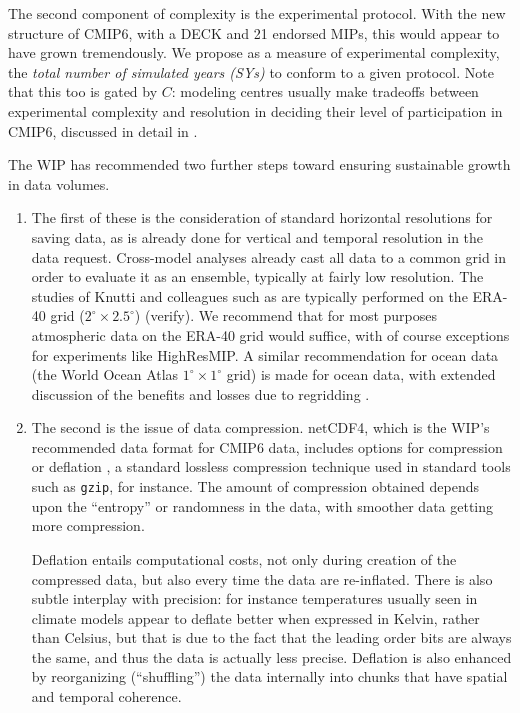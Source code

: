 \documentclass[gmd,manuscript]{copernicus}
\newcommand{\bibref}[1] { \cite{ref:#1}}
\newcommand{\pipref}[1] {\citep{ref:#1}}
\begin{document}
\begin{description}
  The second component of complexity is the experimental protocol.
  With the new structure of CMIP6, with a DECK and 21 endorsed MIPs,
  this would appear to have grown tremendously. We propose as a
  measure of experimental complexity, the \emph{total number of
    simulated years (SYs)} to conform to a given protocol. Note that
  this too is gated by $C$: modeling centres usually make tradeoffs
  between experimental complexity and resolution in deciding their
  level of participation in CMIP6, discussed in detail in
  \bibref{balajietal2017}.
\end{description}

The WIP has recommended two further steps toward ensuring sustainable
growth in data volumes.

\begin{enumerate}
\item The first of these is the consideration of standard horizontal
  resolutions for saving data, as is already done for vertical and
  temporal resolution in the data request. Cross-model analyses
  already cast all data to a common grid in order to evaluate it as an
  ensemble, typically at fairly low resolution. The studies of Knutti
  and colleagues such as \bibref{knuttietal2017} are typically
  performed on the ERA-40 grid ($2^\circ\times 2.5^\circ$) (verify).
  We recommend that for most purposes atmospheric data on the ERA-40
  grid would suffice, with of course exceptions for experiments like
  HighResMIP. A similar recommendation for ocean data (the World Ocean
  Atlas $1^\circ\times 1^\circ$ grid) is made for ocean data, with
  extended discussion of the benefits and losses due to regridding
  \citep[see][]{ref:griffiesetal2014,ref:griffiesetal2016}.
\item The second is the issue of data compression. netCDF4, which is
  the WIP's recommended data format for CMIP6 data, includes options
  for compression or deflation \pipref{zivlempel1977}, a
  standard lossless compression technique used in standard tools such
  as \texttt{gzip}, for instance. The amount of compression obtained
  depends upon the ``entropy'' or randomness in the data, with
  smoother data getting more compression.

  Deflation entails computational costs, not only during creation of
  the compressed data, but also every time the data are re-inflated.
  There is also subtle interplay with precision: for instance
  temperatures usually seen in climate models appear to deflate better
  when expressed in Kelvin, rather than Celsius, but that is due to
  the fact that the leading order bits are always the same, and thus
  the data is actually less precise. Deflation is also enhanced by
  reorganizing (``shuffling'') the data internally into chunks that
  have spatial and temporal coherence.


\end{enumerate}
\end{document}
